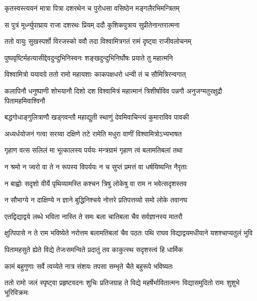 \twolineshloka
{कृतस्वस्त्ययनं मात्रा पित्रा दशरथेन च}
{पुरोधसा वसिष्ठेन मङ्गलैरभिमन्त्रितम्} %

\twolineshloka
{स पुत्रं मूर्ध्न्युपाघ्राय राजा दशरथः प्रियम्}
{ददौ कुशिकपुत्राय सुप्रीतेनान्तरात्मना} %

\twolineshloka
{ततो वायुः सुखस्पर्शो विरजस्को ववौ तदा}
{विश्वामित्रगतं रामं दृष्ट्वा राजीवलोचनम्} %

\twolineshloka
{पुष्पवृष्टिर्महत्यासीद्देवदुन्दुभिनिस्वनः}
{शङ्खदुन्दुभिनिर्घोषः प्रयाते तु महात्मनि} %

\twolineshloka
{विश्वामित्रो ययावग्रे ततो रामो महायशाः}
{काकपक्षधरो धन्वी तं च सौमित्रिरन्वगात्} %

\threelineshloka
{कलापिनौ धनुष्पाणी शोभयानौ दिशो दश}
{विश्वामित्रं महात्मानं त्रिशीर्षाविव पन्नगौ}
{अनुजग्मतुरक्षुद्रौ पितामहमिवाश्विनौ} %

\twolineshloka
{बद्धगोधाङ्गुलित्राणौ खड्गवन्तौ महाद्युती}
{स्थाणुं देवमिवाचिन्त्यं कुमाराविव पावकी} %

\twolineshloka
{अध्यर्धयोजनं गत्वा सरय्वा दक्षिणे तटे}
{रामेति मधुरा वाणीं विश्वामित्रोऽभ्यभाषत} %

\twolineshloka
{गृहाण वत्स सलिलं मा भूत्कालस्य पर्ययः}
{मन्त्रग्रामं गृहाण त्वं बलामतिबलां तथा} %

\twolineshloka
{न श्रमो न ज्वरो वा ते न रूपस्य विपर्ययः}
{न च सुप्तं प्रमत्तं वा धर्षयिष्यन्ति नैरृताः} %

\twolineshloka
{न बाह्वोः सदृशो वीर्ये पृथिव्यामस्ति कश्चन}
{त्रिषु लोकेषु वा राम न भवेत्सदृशस्तव} %

\twolineshloka
{न सौभाग्ये न दाक्षिण्ये न ज्ञाने बुद्धिनिश्चये}
{नोत्तरे प्रतिपत्तव्यो समो लोके तवानघ} %

\twolineshloka
{एतद्विद्याद्वये लब्धे भविता नास्ति ते समः}
{बला चातिबला चैव सर्वज्ञानस्य मातरौ} %

\threelineshloka
{क्षुत्पिपासे न ते राम भविष्येते नरोत्तम}
{बलामतिबलां चैव पठतः पथि राघव}
{विद्याद्वयमधीयाने यशश्चाप्यतुलं भुवि} %

\twolineshloka
{पितामहसुते ह्येते विद्ये तेजःसमन्विते}
{प्रदातुं तव काकुत्स्थ सदृशस्त्वं हि धार्मिक} %

\twolineshloka
{कामं बहुगुणाः सर्वे त्वय्येते नात्र संशयः}
{तपसा सम्भृते चैते बहुरूपे भविष्यतः} %

\threelineshloka
{ततो रामो जलं स्पृष्ट्वा प्रहृष्टवदनः शुचिः}
{प्रतिजग्राह ते विद्ये महर्षेर्भावितात्मनः}
{विद्यासमुदितो रामः शुशुभे भूरिविक्रमः} %

